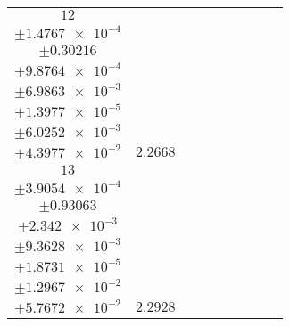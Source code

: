 \documentclass[8pt]{article}
\begin{document}
\begin{longtable}[l]{c c c c c c c c c}
$\num{12}$ & \begin{tabular}[c]{@{}c@{}}$\num{2.8857e-2}$ \\ $\pm\num{1.4767e-4}$\end{tabular} & \begin{tabular}[c]{@{}c@{}}$\num{-0.33534}$ \\ $\pm\num{0.30216}$\end{tabular} & \begin{tabular}[c]{@{}c@{}}$\num{-7.0273}$ \\ $\pm\num{9.8764e-4}$\end{tabular} & \begin{tabular}[c]{@{}c@{}}$\num{3.6196e+3}$ \\ $\pm\num{6.9863e-3}$\end{tabular} & \begin{tabular}[c]{@{}c@{}}$\num{7.2412}$ \\ $\pm\num{1.3977e-5}$\end{tabular} & \begin{tabular}[c]{@{}c@{}}$\num{1.1475}$ \\ $\pm\num{6.0252e-3}$\end{tabular} & \begin{tabular}[c]{@{}c@{}}$\num{4.125}$ \\ $\pm\num{4.3977e-2}$\end{tabular} & $\num{2.2668}$\\
$\num{13}$ & \begin{tabular}[c]{@{}c@{}}$\num{2.8564e-2}$ \\ $\pm\num{3.9054e-4}$\end{tabular} & \begin{tabular}[c]{@{}c@{}}$\num{0.59915}$ \\ $\pm\num{0.93063}$\end{tabular} & \begin{tabular}[c]{@{}c@{}}$\num{-0.85506}$ \\ $\pm\num{2.342e-3}$\end{tabular} & \begin{tabular}[c]{@{}c@{}}$\num{3.6257e+3}$ \\ $\pm\num{9.3628e-3}$\end{tabular} & \begin{tabular}[c]{@{}c@{}}$\num{7.2535}$ \\ $\pm\num{1.8731e-5}$\end{tabular} & \begin{tabular}[c]{@{}c@{}}$\num{1.1677}$ \\ $\pm\num{1.2967e-2}$\end{tabular} & \begin{tabular}[c]{@{}c@{}}$\num{4.0418}$ \\ $\pm\num{5.7672e-2}$\end{tabular} & $\num{2.2928}$\\

\end{longtable}
\end{document}
